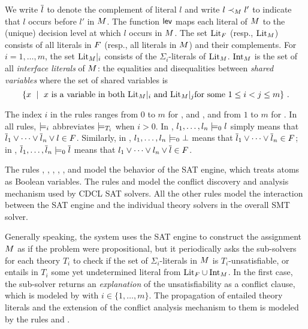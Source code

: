 \documentclass{svjour3}                     %
\begin{document}
We write $\compl{l}$ to denote the complement of literal $l$ and write
$l \prec_\Mc l'$ to indicate that $l$ occurs before $l'$ in $\Mc$.
The function $\lev$ maps each literal of $\Mc$ to the (unique) decision level
at which $l$ occurs in $\Mc$.
The set $\lits{\Fc}$ (resp., $\lits{\Mc}$) consists of all literals 
in $\Fc$ (resp., all literals in $\Mc$) and their complements.
For $i=1,\ldots,m$, the set $\lits{\Mc}\vert_i$ consists 
of the $\Sigma_i$-literals of $\lits{\Mc}$.
$\ilits{\Mc}$ is the set of all \emph{interface literals} of $\Mc$:
the equalities and disequalities between \emph{shared variables}
where the set of shared variables is
\[
\{x\ \mid\ x \text{ is a variable in both } 
             \lits{\Mc}\vert_i \text{ and } \lits{\Mc}\vert_j
             \text{for some }1 \le i < j \le m \} \ .
\]

The index $i$ in the rules ranges from $0$ to $m$ 
for ,  and ,
and from $1$ to $m$ for .
In all rules, $\ent[i]$ abbreviates $\ent[T_i]$ when $i > 0$.
In , $l_1,\ldots, l_n \ent[0] l$ simply means that 
$\compl{l}_1 \lor \cdots \lor \compl{l}_n \lor l \in \Fc$.
Similarly,
in , $l_1,\ldots, l_n \ent[0] \bot$ means that 
$\compl{l}_1 \lor \cdots \lor \compl{l}_n \in \Fc$;
in , $\compl{l}_1, \ldots, \compl{l}_n \ent[0] \compl{l}$ means that 
$l_1 \lor \cdots \lor l_n \lor \compl{l} \in \Fc$.

The rules \decide, , , , %
\plearn, and \backjump
model the behavior of the SAT engine, which treats atoms as Boolean variables.
The rules  and  model the conflict discovery and analysis
mechanism used by CDCL SAT solvers.
All the other rules model the interaction between the SAT engine and the individual theory solvers
in the overall SMT solver.

Generally speaking, the system uses the SAT engine to construct
the assignment $\Mc$ as if the problem were propositional, 
but it periodically asks the sub-solvers for each theory $T_i$ to check 
if the set of $\Sigma_i$-literals in $\Mc$ is $T_i$-unsatisfiable, 
or entails in $T_i$ some yet undetermined literal from $\lits{\Fc}\cup \ilits{\Mc}$.
In the first case, the sub-solver returns an \emph{explanation} of 
the unsatisfiability as a conflict clause, which is modeled by 
with $i\in\{1,\ldots,m\}$.
The propagation of entailed theory literals and the extension 
of the conflict analysis mechanism to them is modeled by the rules 
 and .
\end{document}
